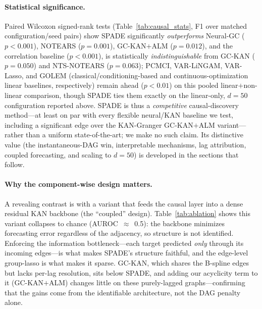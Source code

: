 \paragraph{Statistical significance.} Paired Wilcoxon signed-rank tests
(Table~\ref{tab:causal_stats}, F1 over matched configuration/seed pairs) show
SPADE significantly \emph{outperforms} Neural-GC ($p<0.001$), NOTEARS
($p{=}0.001$), GC-KAN$+$ALM ($p{=}0.012$), and the correlation baseline
($p<0.001$), is statistically
\emph{indistinguishable} from GC-KAN ($p{=}0.050$) and NTS-NOTEARS
($p{=}0.063$); PCMCI, VAR-LiNGAM, VAR-Lasso, and
GOLEM (classical/conditioning-based and continuous-optimization linear baselines,
respectively) remain ahead ($p<0.01$) on this pooled linear$+$non-linear
comparison, though SPADE ties them exactly on the linear-only, $d{=}50$
configuration reported above. SPADE is thus a \emph{competitive}
causal-discovery method---at least on par with every flexible neural/KAN
baseline we test, including a significant edge over the KAN-Granger
GC-KAN$+$ALM variant---rather than a uniform state-of-the-art; we make
no such claim. Its
distinctive value (the instantaneous-DAG win, interpretable mechanisms, lag
attribution, coupled forecasting, and scaling to $d{=}50$) is developed in the
sections that follow.

\paragraph{Why the component-wise design matters.} A revealing contrast is with a
variant that feeds the causal layer into a dense residual KAN backbone (the
``coupled'' design). Table~\ref{tab:ablation} shows this variant collapses to
chance (AUROC~$\approx$~0.5): the backbone minimizes forecasting error regardless
of the adjacency, so structure is not identified. Enforcing the information
bottleneck---each target predicted \emph{only} through its incoming edges---is
what makes SPADE's structure faithful, and the edge-level group-lasso is what
makes it sparse. GC-KAN, which shares the B-spline edges but lacks per-lag
resolution, sits below SPADE, and adding our acyclicity term to it
(GC-KAN$+$ALM) changes little on these purely-lagged graphs---confirming that the
gains come from the identifiable architecture, not the DAG penalty alone.

\begin{table}[t]
\centering
\caption{Causal discovery on synthetic data, split by mechanism type
(mean over configurations $\times$ 3 seeds). AUROC/AUPRC are threshold-free;
F1 uses each method's best threshold. Higher is better.}
\label{tab:causal}
\end{table}

